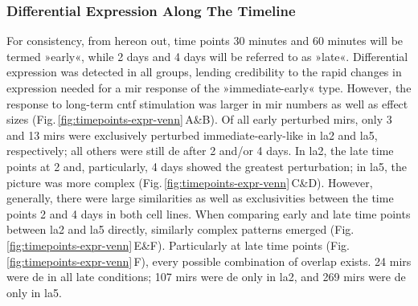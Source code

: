 \subsubsection{Differential Expression Along The Timeline} \label{sec:cellculture:along}
For consistency, from hereon out, time points 30 minutes and 60 minutes will be termed »early«, while 2 days and 4 days will be referred to as »late«. Differential expression was detected in all groups, lending credibility to the rapid changes in expression needed for a \ac{mir} response of the »immediate-early« type. However, the response to long-term \ac{cntf} stimulation was larger in \ac{mir} numbers as well as effect sizes (Fig.\,\ref{fig:timepoints-expr-venn}\,A\&B). Of all early perturbed \acp{mir}, only 3 and 13 \acp{mir} were exclusively perturbed immediate-early-like in \ac{la2} and \ac{la5}, respectively; all others were still \ac{de} after 2 and/or 4 days. In \ac{la2}, the late time points at 2 and, particularly, 4 days showed the greatest perturbation; in \ac{la5}, the picture was more complex (Fig.\,\ref{fig:timepoints-expr-venn}\,C\&D). However, generally, there were large similarities as well as exclusivities between the time points 2 and 4 days in both cell lines. When comparing early and late time points between \ac{la2} and \ac{la5} directly, similarly complex patterns emerged (Fig.\,\ref{fig:timepoints-expr-venn}\,E\&F). Particularly at late time points (Fig.\,\ref{fig:timepoints-expr-venn}\,F), every possible combination of overlap exists. 24 \acp{mir} were \ac{de} in all late conditions; 107 \acp{mir} were \ac{de} only in \ac{la2}, and 269 \acp{mir} were \ac{de} only in \ac{la5}. 

